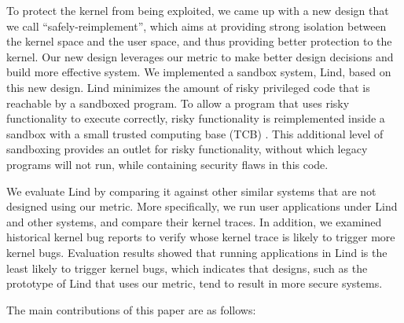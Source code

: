 To protect the kernel from being exploited, we came up with a new design that 
we call ``safely-reimplement'', 
which aims at providing strong isolation between the kernel space and the user space, 
and thus providing better protection to the kernel. Our new design leverages 
our metric to make better design decisions and build more effective system. 
We implemented a sandbox system, Lind, based on this new design.
Lind minimizes the amount of risky privileged code that is reachable by a
sandboxed program.  To allow a program that uses risky functionality to
execute correctly, risky functionality is reimplemented inside a sandbox with
a small trusted computing base (TCB) . 
This additional level of sandboxing provides an outlet for risky functionality, without which
legacy programs will not run, while containing security flaws in this code. 

We evaluate Lind by comparing it against other similar systems 
that are not designed using our metric. 
More specifically, we run user applications
under Lind and other systems, and compare their kernel traces. In addition, we examined historical
kernel bug reports to verify whose kernel trace is likely to trigger more
kernel bugs. 
Evaluation results showed that running applications in Lind is the least likely to trigger kernel bugs, 
which indicates that designs, such as the prototype of Lind that uses our metric, 
tend to result in more secure systems. 

The main contributions of this paper are as follows:

